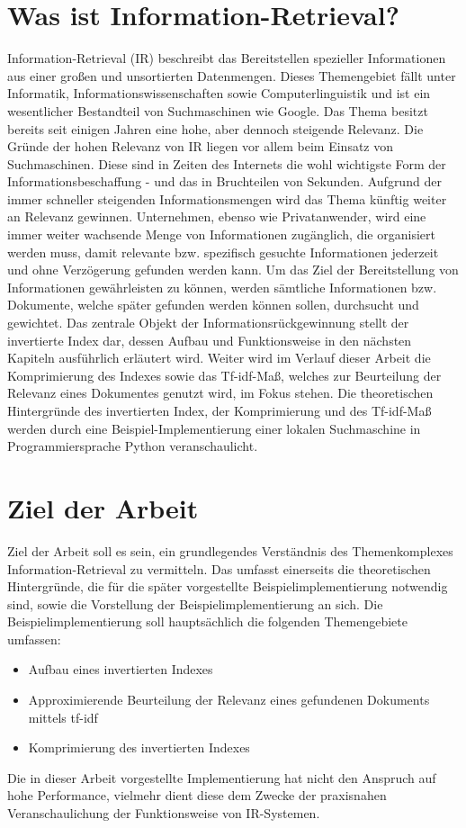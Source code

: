 \section{Was ist Information-Retrieval?}
Information-Retrieval (IR) beschreibt das Bereitstellen spezieller Informationen aus einer großen und unsortierten Datenmengen.
Dieses Themengebiet fällt unter Informatik, Informationswissenschaften sowie Computerlinguistik und ist ein wesentlicher Bestandteil von Suchmaschinen wie Google.
\newline
Das Thema besitzt bereits seit einigen Jahren eine hohe, aber dennoch steigende Relevanz. Die Gründe der hohen Relevanz von IR liegen vor allem beim Einsatz von Suchmaschinen. Diese sind in Zeiten des Internets die wohl wichtigste Form
der Informationsbeschaffung - und das in Bruchteilen von Sekunden. Aufgrund der immer schneller steigenden Informationsmengen wird das Thema künftig weiter an Relevanz gewinnen. Unternehmen, ebenso wie Privatanwender, wird eine immer weiter
wachsende Menge von Informationen zugänglich, die organisiert werden muss, damit relevante bzw. spezifisch gesuchte Informationen jederzeit und ohne Verzögerung gefunden werden kann.
\newline
Um das Ziel der Bereitstellung von Informationen gewährleisten zu können, werden sämtliche Informationen bzw. Dokumente, welche später gefunden werden können sollen, durchsucht und gewichtet.
Das zentrale Objekt der Informationsrückgewinnung stellt der invertierte Index dar, dessen Aufbau und Funktionsweise in den nächsten Kapiteln ausführlich erläutert wird.
Weiter wird im Verlauf dieser Arbeit die Komprimierung des Indexes sowie das Tf-idf-Maß, welches zur Beurteilung der Relevanz eines Dokumentes genutzt wird, im Fokus stehen.
\newline
Die theoretischen Hintergründe des invertierten Index, der Komprimierung und des Tf-idf-Maß werden durch eine Beispiel-Implementierung einer lokalen Suchmaschine in Programmiersprache Python veranschaulicht.

\section{Ziel der Arbeit}
Ziel der Arbeit soll es sein, ein grundlegendes Verständnis des Themenkomplexes Information-Retrieval zu vermitteln.
Das umfasst einerseits die theoretischen Hintergründe, die für die später vorgestellte Beispielimplementierung notwendig sind, sowie die Vorstellung der Beispielimplementierung an sich.
\newline
Die Beispielimplementierung soll hauptsächlich die folgenden Themengebiete umfassen:
\newpage
\begin{itemize}
	\item Aufbau eines invertierten Indexes
	\item Approximierende Beurteilung der Relevanz eines gefundenen Dokuments mittels tf-idf
	\item Komprimierung des invertierten Indexes
\end{itemize}
Die in dieser Arbeit vorgestellte Implementierung hat nicht den Anspruch auf hohe Performance, vielmehr dient diese dem Zwecke der praxisnahen Veranschaulichung der Funktionsweise von IR-Systemen.

